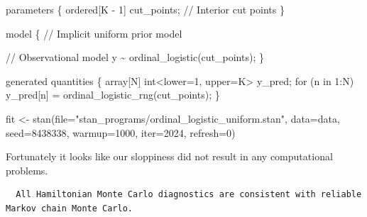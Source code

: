 \documentclass[
  letterpaper,
  DIV=11,
  numbers=noendperiod]{scrartcl}
\newenvironment{Shaded}{\begin{snugshade}}{\end{snugshade}}
\newcommand{\AttributeTok}[1]{\textcolor[rgb]{0.40,0.45,0.13}{#1}}
\newcommand{\CommentTok}[1]{\textcolor[rgb]{0.37,0.37,0.37}{#1}}
\newcommand{\ControlFlowTok}[1]{\textcolor[rgb]{0.00,0.23,0.31}{#1}}
\newcommand{\DataTypeTok}[1]{\textcolor[rgb]{0.68,0.00,0.00}{#1}}
\newcommand{\DecValTok}[1]{\textcolor[rgb]{0.68,0.00,0.00}{#1}}
\newcommand{\FunctionTok}[1]{\textcolor[rgb]{0.28,0.35,0.67}{#1}}
\newcommand{\KeywordTok}[1]{\textcolor[rgb]{0.00,0.23,0.31}{#1}}
\newcommand{\NormalTok}[1]{\textcolor[rgb]{0.00,0.23,0.31}{#1}}
\newcommand{\OtherTok}[1]{\textcolor[rgb]{0.00,0.23,0.31}{#1}}
\newcommand{\SpecialCharTok}[1]{\textcolor[rgb]{0.37,0.37,0.37}{#1}}
\newcommand{\StringTok}[1]{\textcolor[rgb]{0.13,0.47,0.30}{#1}}
\begin{document}
\begin{codelisting}
\begin{Shaded}
\begin{Highlighting}[]
\KeywordTok{parameters}\NormalTok{ \{}
  \DataTypeTok{ordered}\NormalTok{[K {-} }\DecValTok{1}\NormalTok{] cut\_points; }\CommentTok{// Interior cut points}
\NormalTok{\}}

\KeywordTok{model}\NormalTok{ \{}
  \CommentTok{// Implicit uniform prior model}

  \CommentTok{// Observational model}
\NormalTok{  y \textasciitilde{} ordinal\_logistic(cut\_points);}
\NormalTok{\}}

\KeywordTok{generated quantities}\NormalTok{ \{}
  \DataTypeTok{array}\NormalTok{[N] }\DataTypeTok{int}\NormalTok{\textless{}}\KeywordTok{lower}\NormalTok{=}\DecValTok{1}\NormalTok{, }\KeywordTok{upper}\NormalTok{=K\textgreater{} y\_pred;}
  \ControlFlowTok{for}\NormalTok{ (n }\ControlFlowTok{in} \DecValTok{1}\NormalTok{:N)}
\NormalTok{    y\_pred[n] = ordinal\_logistic\_rng(cut\_points);}
\NormalTok{\}}
\end{Highlighting}
\end{Shaded}

\end{codelisting}

\begin{Shaded}
\begin{Highlighting}[]
\NormalTok{fit }\OtherTok{\textless{}{-}} \FunctionTok{stan}\NormalTok{(}\AttributeTok{file=}\StringTok{"stan\_programs/ordinal\_logistic\_uniform.stan"}\NormalTok{,}
            \AttributeTok{data=}\NormalTok{data, }\AttributeTok{seed=}\DecValTok{8438338}\NormalTok{,}
            \AttributeTok{warmup=}\DecValTok{1000}\NormalTok{, }\AttributeTok{iter=}\DecValTok{2024}\NormalTok{, }\AttributeTok{refresh=}\DecValTok{0}\NormalTok{)}
\end{Highlighting}
\end{Shaded}

Fortunately it looks like our sloppiness did not result in any
computational problems.

\begin{Shaded}
\end{Shaded}

\begin{verbatim}
  All Hamiltonian Monte Carlo diagnostics are consistent with reliable
Markov chain Monte Carlo.
\end{verbatim}
\end{document}
